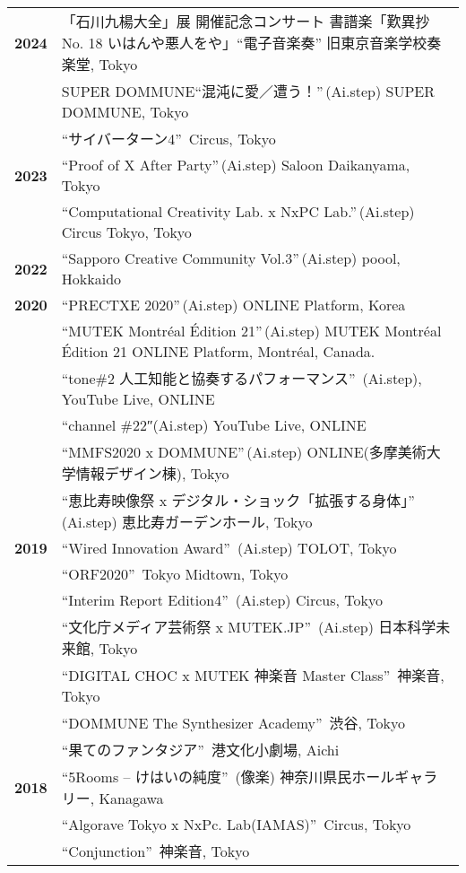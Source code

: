 \documentclass[8pt,a4paper]{article}
\begin{document}
\begin{longtable}{@{}p{1.2cm}@{\hspace{0.5cm}}p{14cm}@{}}
\textbf{2024} & 「石川九楊大全」展 開催記念コンサート 書譜楽「歎異抄 No. 18 いはんや悪人をや」``電子音楽奏'' 旧東京音楽学校奏楽堂, Tokyo \\
& SUPER DOMMUNE``混沌に愛／遭う！''\,(Ai.step) SUPER DOMMUNE, Tokyo \\
& ``サイバーターン4''\, Circus, Tokyo \\[0.2em]
\textbf{2023} & ``Proof of X After Party''\,(Ai.step) Saloon Daikanyama, Tokyo \\
& ``Computational Creativity Lab. x NxPC Lab.''\,(Ai.step) Circus Tokyo, Tokyo \\[0.2em]
\textbf{2022} & ``Sapporo Creative Community Vol.3''\,(Ai.step) poool, Hokkaido \\[0.2em]
\textbf{2020} & ``PRECTXE 2020''\,(Ai.step) ONLINE Platform, Korea \\
& ``MUTEK Montréal Édition 21''\,(Ai.step) MUTEK Montréal Édition 21 ONLINE Platform, Montréal, Canada. \\
& ``tone\#2 人工知能と協奏するパフォーマンス''\, (Ai.step), YouTube Live, ONLINE \\
& ``channel \#22″(Ai.step) YouTube Live, ONLINE \\
& ``MMFS2020 x DOMMUNE''\,(Ai.step) ONLINE(多摩美術大学情報デザイン棟), Tokyo \\
& ``恵比寿映像祭 x デジタル・ショック「拡張する身体」''\,(Ai.step) 恵比寿ガーデンホール, Tokyo \\[0.2em]
\textbf{2019} & ``Wired Innovation Award''\, (Ai.step) TOLOT, Tokyo \\
& ``ORF2020''\, Tokyo Midtown, Tokyo \\
& ``Interim Report Edition4''\, (Ai.step) Circus, Tokyo \\
& ``文化庁メディア芸術祭 x MUTEK.JP''\, (Ai.step) 日本科学未来館, Tokyo \\
& ``DIGITAL CHOC x MUTEK 神楽音 Master Class''\, 神楽音, Tokyo \\
& ``DOMMUNE The Synthesizer Academy''\, 渋谷, Tokyo \\
& ``果てのファンタジア''\, 港文化小劇場, Aichi \\[0.2em]
\textbf{2018} & ``5Rooms – けはいの純度''\, (像楽) 神奈川県民ホールギャラリー, Kanagawa \\
& ``Algorave Tokyo x NxPc. Lab(IAMAS)''\, Circus, Tokyo \\
& ``Conjunction''\, 神楽音, Tokyo \\

\end{longtable}
\end{document}

